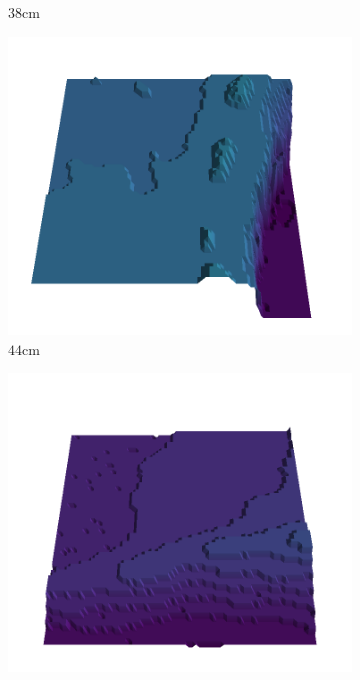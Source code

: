 \documentclass[../document.tex]{subfiles}
\begin{document}
\begin{figure}[H]
\begin{subfigure}[b]{0.19\textwidth}
    \caption{$38$cm}
    \end{subfigure}
    \begin{subfigure}[b]{0.19\textwidth}
    \includegraphics[width=\linewidth]{../img/5/quarry/all/best/44-patch-3d-majavi-colormap-2.png}
    \caption{$44$cm}
    \end{subfigure}
    \begin{subfigure}[b]{0.19\textwidth}
    \includegraphics[width=\linewidth]{../img/5/quarry/all/best/45-patch-3d-majavi-colormap-3.png}

\end{subfigure}
\end{figure}
\end{document}
